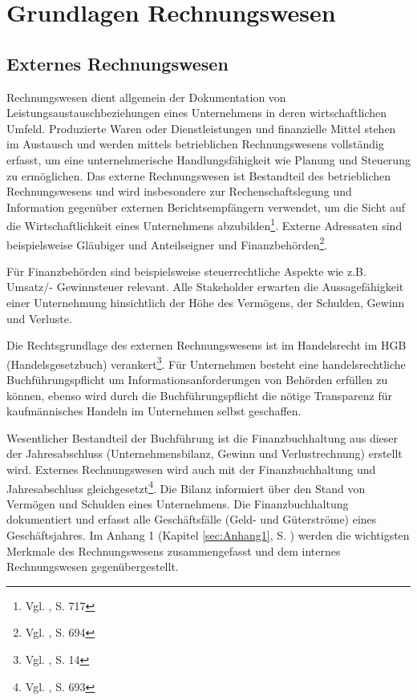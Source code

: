 \section{Grundlagen Rechnungswesen}

\subsection{Externes Rechnungswesen}
\label{ssec:externesRechnungswesen}
Rechnungswesen dient allgemein der Dokumentation von Leistungsaustauschbeziehungen eines Unternehmens in deren wirtschaftlichen Umfeld. Produzierte Waren oder Dienstleistungen und finanzielle Mittel stehen im Austausch und werden mittels betrieblichen Rechnungswesens vollständig erfasst, um eine unternehmerische Handlungsfähigkeit wie Planung und Steuerung zu ermöglichen. Das externe Rechnungswesen ist Bestandteil des betrieblichen Rechnungswesens und wird insbesondere zur Rechenschaftslegung und Information gegenüber externen Berichtsempfängern verwendet, um die Sicht auf die Wirtschaftlichkeit eines Unternehmens abzubilden\footnote{Vgl. \cite{Wohe2000}, S. 717}. Externe Adressaten sind beispielsweise Gläubiger und Anteilseigner und Finanzbehörden\footnote{Vgl. \cite{Wohe2000}, S. 694}.

Für Finanzbehörden sind beispielsweise steuerrechtliche Aspekte wie z.B. Umsatz/- Gewinnsteuer relevant. Alle Stakeholder erwarten die Aussagefähigkeit einer Unternehmung hinsichtlich der Höhe des Vermögens, der Schulden, Gewinn und Verluste. 

Die Rechtsgrundlage des externen Rechnungswesens ist im Handelsrecht im  HGB (Handelsgesetzbuch) verankert\footnote{Vgl. \cite{Woltje2008}, S. 14}. Für Unternehmen besteht eine handelsrechtliche \\Buchführungspflicht um Informationsanforderungen von Behörden erfüllen zu können, ebenso wird durch die Buchführungspflicht die nötige Transparenz für kaufmännisches Handeln im Unternehmen selbst geschaffen.

Wesentlicher Bestandteil der Buchführung ist die Finanzbuchhaltung aus dieser der Jahresabschluss (Unternehmensbilanz,  Gewinn und Verlustrechnung) erstellt wird. Externes Rechnungswesen wird auch mit der Finanzbuchhaltung und Jahresabschluss gleichgesetzt\footnote{Vgl. \cite{Wohe2000}, S. 693}. Die Bilanz informiert über den Stand von Vermögen und Schulden eines Unternehmens. Die Finanzbuchhaltung dokumentiert
und erfasst alle Geschäftsfälle (Geld- und Güterströme) eines Geschäftsjahres.
Im Anhang 1 (Kapitel \ref{sec:Anhang1}, S. \pageref{tbl2}) werden die wichtigsten Merkmale des Rechnungswesens zusammengefasst und dem internes Rechnungswesen gegenübergestellt.

